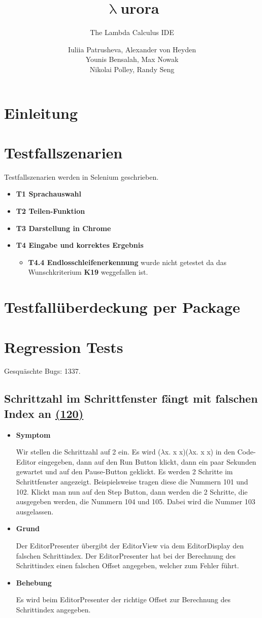 \documentclass[parskip=full,11pt,twoside]{scrartcl}
\title{\textbf{$\uplambda$}urora}
\subtitle{The Lambda Calculus IDE}
\author{Iuliia Patrusheva, Alexander von Heyden\\
    Younis Bensalah, Max Nowak\\
    Nikolai Polley, Randy Seng}
\newcommand{\issueref}[1]{
    \href{https://git.scc.kit.edu/ap/Aurora/issues/#1}{(#1)}
}
\newcommand{\regrtest}[5]{
    \subsection{#1 \issueref{#2}}
    \begin{itemize}
        \item \textbf{Symptom}
            #3
        \item \textbf{Grund}
            #4
        \item \textbf{Behebung}
            #5
    \end{itemize}
}
\newcommand{\testcase}[3]{
    \item \textbf{#1 #2}
        \begin{itemize}
            #3
        \end{itemize}
}
\newcommand{\testcasestep}[3]{
    \item \textbf{#1 #2} #3
}
\begin{document}
    \maketitle
    \tableofcontents
    \newpage

    \section{Einleitung}


    \section{Testfallszenarien}
    Testfallszenarien werden in Selenium geschrieben.
    \begin{itemize}
        \testcase{T1}{Sprachauswahl}{
        }
        \testcase{T2}{Teilen-Funktion}{
        }
        \testcase{T3}{Darstellung in Chrome}{
        }
        \testcase{T4}{Eingabe und korrektes Ergebnis}{
            \testcasestep{T4.4}{Endlosschleifenerkennung}{wurde nicht getestet da das Wunschkriterium \textbf{K19}
            weggefallen ist.}
        }
    \end{itemize}

    \section{Testfallüberdeckung per Package}

    \section{Regression Tests}
    Gesquäschte Bugs: 1337.
    
    
    \regrtest{Schrittzahl im Schrittfenster fängt mit falschen Index an}{120}{
    	Wir stellen die Schrittzahl auf 2 ein.
		Es wird ($\lambda$x. x x)($\lambda$x. x x) in den Code-Editor eingegeben,  
		dann auf den Run Button klickt, dann ein paar Sekunden gewartet und auf den Pause-Button geklickt. Es werden 2 Schritte im Schrittfenster angezeigt. Beispielsweise tragen diese die Nummern 101 und 102.
		Klickt man nun auf den Step Button, dann werden die 2 Schritte, die ausgegeben werden, die Nummern 104 und 105.
		Dabei wird die Nummer 103 ausgelassen.
    }{
    	Der EditorPresenter übergibt der EditorView via dem EditorDisplay den falschen Schrittindex. 
		Der EditorPresenter hat bei der Berechnung des Schrittindex einen falschen Offset angegeben, welcher zum Fehler führt.
    }{
    	Es wird beim EditorPresenter der richtige Offset zur Berechnung des Schrittindex angegeben. 
    }
    
\end{document}
